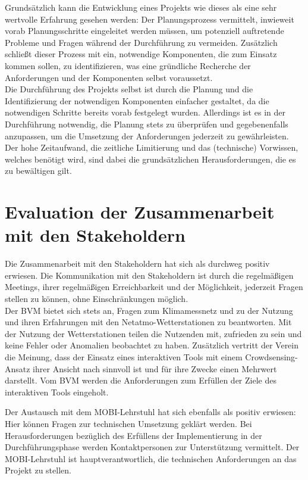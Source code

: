 Grundsätzlich kann die Entwicklung eines Projekts wie dieses als eine sehr wertvolle Erfahrung gesehen werden: Der Planungsprozess vermittelt, inwieweit vorab Planungsschritte eingeleitet werden müssen, um potenziell auftretende Probleme und Fragen während der Durchführung zu vermeiden. Zusätzlich schließt dieser Prozess mit ein, notwendige Komponenten, die zum Einsatz kommen sollen, zu identifizieren, was eine gründliche Recherche der Anforderungen und der Komponenten selbst voraussetzt. \\ Die Durchführung des Projekts selbst ist durch die Planung und die Identifizierung der notwendigen Komponenten einfacher gestaltet, da die notwendigen Schritte bereits vorab festgelegt wurden. Allerdings ist es in der Durchführung notwendig, die Planung stets zu überprüfen und gegebenenfalls anzupassen, um die Umsetzung der Anforderungen jederzeit zu gewährleisten. Der hohe Zeitaufwand, die zeitliche Limitierung und das (technische) Vorwissen, welches benötigt wird, sind dabei die grundsätzlichen Herausforderungen, die es zu bewältigen gilt.

\section{Evaluation der Zusammenarbeit mit den Stakeholdern}
\label{sec:evaluationstakeholder}
Die Zusammenarbeit mit den Stakeholdern hat sich als durchweg positiv erwiesen. Die Kommunikation mit den Stakeholdern ist durch die regelmäßigen Meetings, ihrer regelmäßigen Erreichbarkeit und der Möglichkeit, jederzeit Fragen stellen zu können, ohne Einschränkungen möglich. \\ Der \ac{BVM} bietet sich stets an, Fragen zum Klimamessnetz und zu der Nutzung und ihren Erfahrungen mit den Netatmo-Wetterstationen zu beantworten. Mit der Nutzung der Wetterstationen teilen die Nutzenden mit, zufrieden zu sein und keine Fehler oder Anomalien beobachtet zu haben. Zusätzlich vertritt der Verein die Meinung, dass der Einsatz eines interaktiven Tools mit einem Crowdsensing-Ansatz ihrer Ansicht nach sinnvoll ist und für ihre Zwecke einen Mehrwert darstellt. Vom \ac{BVM} werden die Anforderungen zum Erfüllen der Ziele des interaktiven Tools eingeholt.

Der Austausch mit dem \ac{MOBI}-Lehrstuhl hat sich ebenfalls als positiv erwiesen: Hier können Fragen zur technischen Umsetzung geklärt werden. Bei Herausforderungen bezüglich des Erfüllens der Implementierung in der Durchführungsphase werden Kontaktpersonen zur Unterstützung vermittelt. Der \ac{MOBI}-Lehrstuhl ist hauptverantwortlich, die technischen Anforderungen an das Projekt zu stellen.

